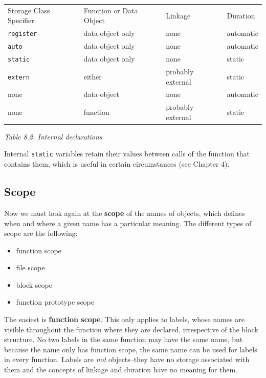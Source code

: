    \begin{tabular}{lllp{\textwidth}}
      Storage Class Specifier & Function or Data Object & Linkage & Duration
     \\

      \texttt{register} & data object only & none & automatic
     \\

      \texttt{auto} & data object only & none & automatic
     \\

      \texttt{static} & data object only & none & static
     \\

      \texttt{extern} & either & probably external & static
     \\

      none & data object & none & automatic
     \\

      none & function & probably external & static
     \\
\end{tabular}

\begin{center}\textit{Table 8.2. Internal declarations}\end{center}


    Internal \texttt{static} variables retain their values between
     calls of the function that contains them, which is useful in certain
     circumstances (see Chapter 4).


   

  

  \subsection{Scope}
   

   Now we must look again at the \textbf{scope} of the names of
    objects, which defines when and where a given name has a particular
    meaning. The different types of scope are the following:


   \begin{itemize}
    \item function scope
    \item file scope
    \item block scope
    \item function prototype scope
   \end{itemize}

   The easiest is \textbf{function scope}. This only applies to labels,
    whose names are visible throughout the function where they are declared,
    irrespective of the block structure. No two labels in the same function
    may have the same name, but because the name only has function scope,
    the same name can be used for labels in every function. Labels are
    \textit{not} objects--they have no storage associated with them and
    the concepts of linkage and duration have no meaning for them.


